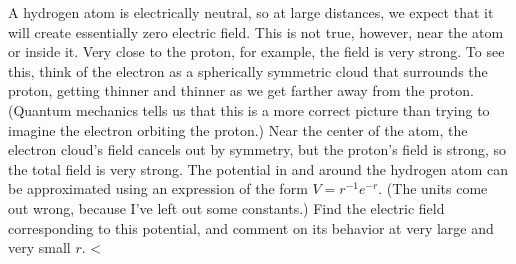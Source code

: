 A hydrogen atom is electrically neutral, so at large distances, we expect that
        it will create essentially zero electric field. This is not true, however, near
        the atom or inside it. Very close to the proton, for example, the field
        is very strong. To see this, think of the electron as a spherically
        symmetric cloud that surrounds the
        proton, getting thinner and thinner as we get farther away from the proton. (Quantum
        mechanics tells us that this is a more correct picture than trying to imagine the
        electron orbiting the proton.)  Near the center of the atom, the electron cloud's
        field cancels out by symmetry, but the proton's field is strong, so the total field
        is very strong. The potential in and around the hydrogen atom can be approximated using
        an expression of the form $V=r^{-1}e^{-r}$. (The units come out wrong, because I've
        left out some constants.) Find the electric field corresponding to this potential, and
        comment on its behavior at very large and very small $r$.
        <%
